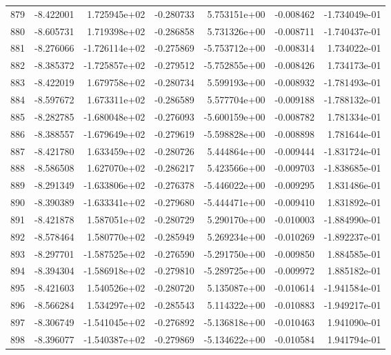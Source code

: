 \begin{tabular}{rrrrrrr}
 879 &  -8.422001 &  1.725945e+02 & -0.280733 &  5.753151e+00 &   -0.008462 & -1.734049e-01 \\
 880 &  -8.605731 &  1.719398e+02 & -0.286858 &  5.731326e+00 &   -0.008711 & -1.740437e-01 \\
 881 &  -8.276066 & -1.726114e+02 & -0.275869 & -5.753712e+00 &   -0.008314 &  1.734022e-01 \\
 882 &  -8.385372 & -1.725857e+02 & -0.279512 & -5.752855e+00 &   -0.008426 &  1.734173e-01 \\
 883 &  -8.422019 &  1.679758e+02 & -0.280734 &  5.599193e+00 &   -0.008932 & -1.781493e-01 \\
 884 &  -8.597672 &  1.673311e+02 & -0.286589 &  5.577704e+00 &   -0.009188 & -1.788132e-01 \\
 885 &  -8.282785 & -1.680048e+02 & -0.276093 & -5.600159e+00 &   -0.008782 &  1.781334e-01 \\
 886 &  -8.388557 & -1.679649e+02 & -0.279619 & -5.598828e+00 &   -0.008898 &  1.781644e-01 \\
 887 &  -8.421780 &  1.633459e+02 & -0.280726 &  5.444864e+00 &   -0.009444 & -1.831724e-01 \\
 888 &  -8.586508 &  1.627070e+02 & -0.286217 &  5.423566e+00 &   -0.009703 & -1.838685e-01 \\
 889 &  -8.291349 & -1.633806e+02 & -0.276378 & -5.446022e+00 &   -0.009295 &  1.831486e-01 \\
 890 &  -8.390389 & -1.633341e+02 & -0.279680 & -5.444471e+00 &   -0.009410 &  1.831892e-01 \\
 891 &  -8.421878 &  1.587051e+02 & -0.280729 &  5.290170e+00 &   -0.010003 & -1.884990e-01 \\
 892 &  -8.578464 &  1.580770e+02 & -0.285949 &  5.269234e+00 &   -0.010269 & -1.892237e-01 \\
 893 &  -8.297701 & -1.587525e+02 & -0.276590 & -5.291750e+00 &   -0.009850 &  1.884585e-01 \\
 894 &  -8.394304 & -1.586918e+02 & -0.279810 & -5.289725e+00 &   -0.009972 &  1.885182e-01 \\
 895 &  -8.421603 &  1.540526e+02 & -0.280720 &  5.135087e+00 &   -0.010614 & -1.941584e-01 \\
 896 &  -8.566284 &  1.534297e+02 & -0.285543 &  5.114322e+00 &   -0.010883 & -1.949217e-01 \\
 897 &  -8.306749 & -1.541045e+02 & -0.276892 & -5.136818e+00 &   -0.010463 &  1.941090e-01 \\
 898 &  -8.396077 & -1.540387e+02 & -0.279869 & -5.134622e+00 &   -0.010584 &  1.941794e-01 \\

\end{tabular}

